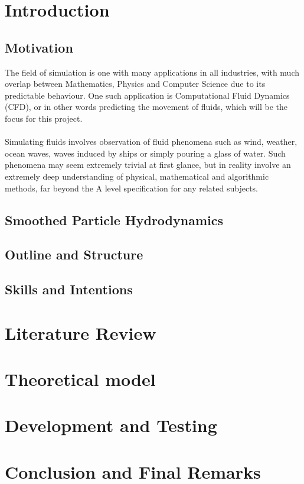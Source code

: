 \documentclass[a4paper,9pt]{article}
\begin{document}
\begin{multicols}{2}
\section{Introduction}
\subsection{Motivation}
The field of simulation is one with many applications in all industries, with much overlap between Mathematics, Physics and Computer Science due to its predictable behaviour. One such application is Computational Fluid Dynamics (CFD), or in other words predicting the movement of fluids, which will be the focus for this project.
\\~\\
\indent Simulating fluids involves observation of fluid phenomena such as wind, weather, ocean waves, waves induced by ships or simply pouring a glass of water. Such phenomena may seem extremely trivial at first glance, but in reality involve an extremely deep understanding of physical, mathematical and algorithmic methods, far beyond the A level specification for any related subjects.
\subsection{Smoothed Particle Hydrodynamics}

\subsection{Outline and Structure}
\subsection{Skills and Intentions}
\section{Literature Review}
\section{Theoretical model}
\section{Development and Testing}
\section{Conclusion and Final Remarks}
\end{multicols}

\newpage


\end{document}
